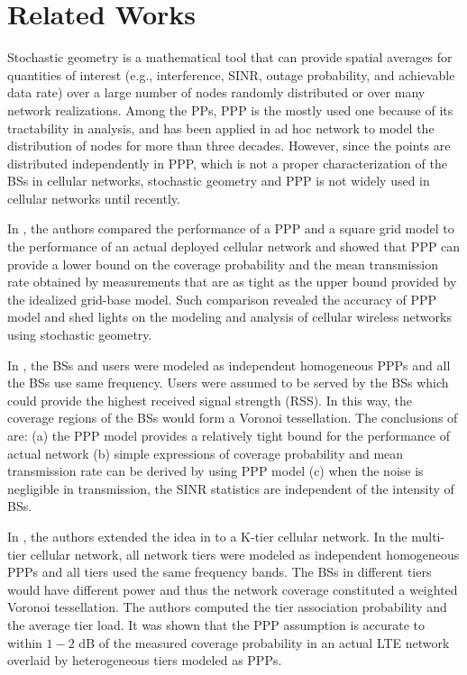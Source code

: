 \documentclass[a4paper,twocolumn]{IEEEtran}
\begin{document}
\section{Related Works}\label{Sec:Rel}
Stochastic geometry is a mathematical tool that can provide spatial averages for quantities of interest (e.g., interference, SINR, outage probability, and achievable data rate) over a large number of nodes randomly distributed or over many network realizations\cite{Haenggi2009JSAC}. Among the PPs, PPP is the mostly used one because of its tractability in analysis, and has been applied in ad hoc network to model the distribution of nodes for more than three decades\cite{Kleinrock1978}. However, since the points are distributed independently in PPP, which is not a proper characterization of the BSs in cellular networks, stochastic geometry and PPP is not widely used in cellular networks until recently.     

In \cite{Andrews2011TC}, the authors compared the performance of a PPP and a square grid model to the performance of an actual deployed cellular network and showed that PPP can provide a lower bound on the coverage probability and the mean transmission rate obtained by measurements that are as tight as the upper bound provided by the idealized grid-base model. Such comparison revealed the accuracy of PPP model and shed lights on the modeling and analysis of cellular wireless networks using stochastic geometry.

In \cite{Andrews2011TC}, the BSs and users were modeled as independent homogeneous PPPs and all the BSs use same frequency. Users were assumed to be served by the BSs which could provide the highest received signal strength (RSS). In this way, the coverage regions of the BSs would form a Voronoi tessellation\cite{Okabe1992}. The conclusions of \cite{Andrews2011TC} are: (a) the PPP model provides a relatively tight bound for the performance of actual network (b) simple expressions of coverage probability and mean transmission rate can be derived by using PPP model (c) when the noise is negligible in transmission, the SINR statistics are independent of the intensity of BSs.

In \cite{Dhillon2012JSAC}, the authors extended the idea in \cite{Andrews2011TC} to a K-tier cellular network. In the multi-tier cellular network, all network tiers were modeled as independent homogeneous PPPs and all tiers used the same frequency bands. The BSs in different tiers would have different power and thus the network coverage constituted a weighted Voronoi tessellation. The authors computed the tier association probability and the average tier load. It was shown that the PPP assumption is accurate to within $1-2$ dB of the measured coverage probability in an actual LTE network overlaid by heterogeneous tiers modeled as PPPs.
\end{document}
